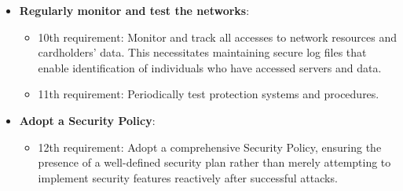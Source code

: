 \begin{itemize}
	\item \textbf{Regularly monitor and test the networks}:
	      \begin{itemize}
		      \item 10th requirement: Monitor and track all accesses to network resources and cardholders' data. This necessitates maintaining secure log files that enable identification of individuals who have accessed servers and data.
		      \item 11th requirement: Periodically test protection systems and procedures.
	      \end{itemize}

	\item \textbf{Adopt a Security Policy}:
	      \begin{itemize}
		      \item 12th requirement: Adopt a comprehensive Security Policy, ensuring the presence of a well-defined security plan rather than merely attempting to implement security features reactively after successful attacks.
	      \end{itemize}
\end{itemize}
